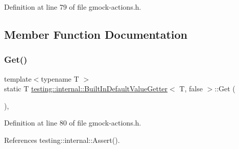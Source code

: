 Definition at line 79 of file gmock-\/actions.\+h.



\subsection{Member Function Documentation}
\mbox{\label{structtesting_1_1internal_1_1BuiltInDefaultValueGetter_3_01T_00_01false_01_4_a8c8e929666f61272961eea21a60de4ad}} 
\subsubsection{\texorpdfstring{Get()}{Get()}}
{\footnotesize\ttfamily template$<$typename T $>$ \\
static T \hyperlink{structtesting_1_1internal_1_1BuiltInDefaultValueGetter}{testing\+::internal\+::\+Built\+In\+Default\+Value\+Getter}$<$ T, false $>$\+::Get (\begin{DoxyParamCaption}{ }\end{DoxyParamCaption})\hspace{0.3cm}{\ttfamily [inline]}, {\ttfamily [static]}}



Definition at line 80 of file gmock-\/actions.\+h.



References testing\+::internal\+::\+Assert().


